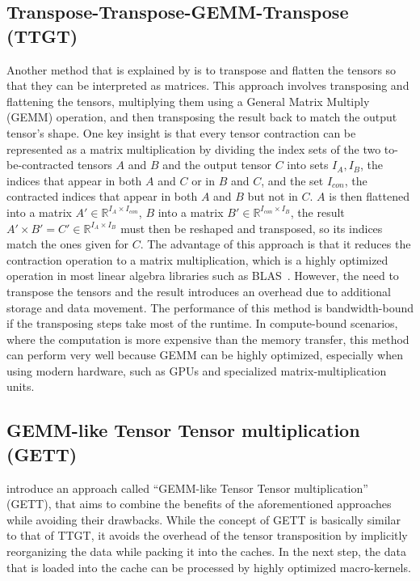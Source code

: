 \subsection{Transpose-Transpose-GEMM-Transpose (TTGT)}
Another method that is explained by \textcite{springer} is to transpose and flatten the tensors so that they can be interpreted as matrices. This approach involves transposing and flattening the tensors, multiplying them using a General Matrix Multiply (GEMM) operation, and then transposing the result back to match the output tensor's shape. 
One key insight is that every tensor contraction can be represented as a matrix multiplication by dividing the index sets of the two to-be-contracted tensors $A$ and $B$ and the output tensor $C$ into sets $I_A, I_B$, the indices that appear in both $A$ and $C$ or in $B$ and $C$, and the set $I_{con}$, the contracted indices that appear in both $A$ and $B$ but not in $C$. $A$ is then flattened into a matrix $A' \in \mathbb{R}^{I_A\times I_{con}}$, $B$ into a matrix $B' \in \mathbb{R}^{I_{con} \times I_B}$, the result $A'\times B' = C' \in \mathbb{R}^{I_A\times I_B}$ must then be reshaped and transposed, so its indices match the ones given for $C$.
The advantage of this approach is that it reduces the contraction operation to a matrix multiplication, which is a highly optimized operation in most linear algebra libraries such as BLAS~\cite{BLAS}. However, the need to transpose the tensors and the result introduces an overhead due to additional storage and data movement. The performance of this method is bandwidth-bound if the transposing steps take most of the runtime. In compute-bound scenarios, where the computation is more expensive than the memory transfer, this method can perform very well because GEMM can be highly optimized, especially when using modern hardware, such as GPUs and specialized matrix-multiplication units.

\subsection{GEMM-like Tensor Tensor multiplication (GETT)}\label{gemm}
\noindent \textcite{springer} introduce an approach called ``GEMM-like Tensor Tensor multiplication'' (GETT), that aims to combine the benefits of the aforementioned approaches while avoiding their drawbacks. 
While the concept of GETT is basically similar to that of TTGT, it avoids the overhead of the tensor transposition by implicitly reorganizing the data while packing it into the caches. In the next step, the data that is loaded into the cache can be processed by highly optimized macro-kernels.

